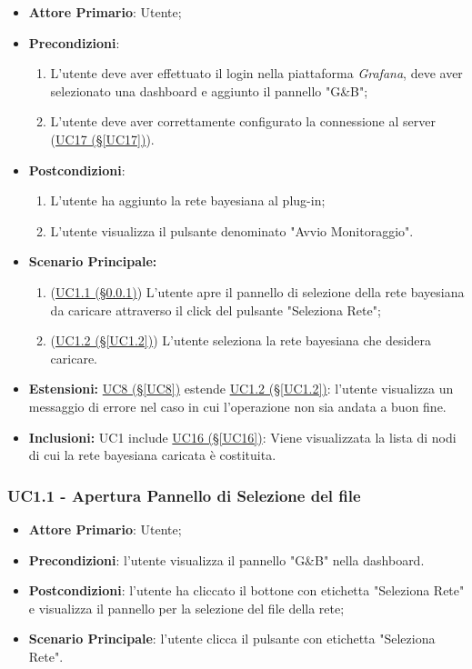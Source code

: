 \begin{itemize}
	\item \textbf{Attore Primario}: Utente;
	\item \textbf{Precondizioni}:
		\begin{enumerate}
			\item L'utente deve aver effettuato il login nella piattaforma \textit{Grafana}, deve aver selezionato una dashboard e aggiunto il pannello "G\&B";
			\item L'utente deve aver correttamente configurato la connessione al server (\hyperref[UC17]{UC17 (§\ref*{UC17})}).
		\end{enumerate}
	\item \textbf{Postcondizioni}:
	\begin{enumerate}
		\item L'utente ha aggiunto la rete bayesiana al plug-in;
		\item L'utente visualizza il pulsante denominato "Avvio Monitoraggio".
	\end{enumerate}
	\item \textbf{Scenario Principale:}
	\begin{enumerate}
		\item (\hyperref[UC1.1]{UC1.1 (§\ref*{UC1.1})}) L'utente apre il pannello di selezione della rete bayesiana da caricare attraverso il click del pulsante "Seleziona Rete";
		\item (\hyperref[UC1.2]{UC1.2 (§\ref*{UC1.2})}) L'utente seleziona la rete bayesiana che desidera caricare.
	\end{enumerate}
	\item \textbf{Estensioni:} \hyperref[UC8]{UC8 (§\ref*{UC8})} estende \hyperref[UC1.2]{UC1.2 (§\ref*{UC1.2})}: l'utente visualizza un messaggio di errore nel caso in cui l'operazione non sia andata a buon fine.
	\item \textbf{Inclusioni:} UC1 include \hyperref[UC16]{UC16 (§\ref*{UC16})}: Viene visualizzata la lista di nodi di cui la rete bayesiana caricata è costituita.
\end{itemize}

\pagebreak

\subsubsection{UC1.1 - Apertura Pannello di Selezione del file}\label{UC1.1}
\begin{itemize}
	\item \textbf{Attore Primario}: Utente;
	\item \textbf{Precondizioni}: l'utente visualizza il pannello "G\&B" nella dashboard.
	\item \textbf{Postcondizioni}: l'utente ha cliccato il bottone con etichetta "Seleziona Rete" e visualizza il pannello per la selezione del file della rete;
	\item \textbf{Scenario Principale}: l'utente clicca il pulsante con etichetta "Seleziona Rete".
\end{itemize}


